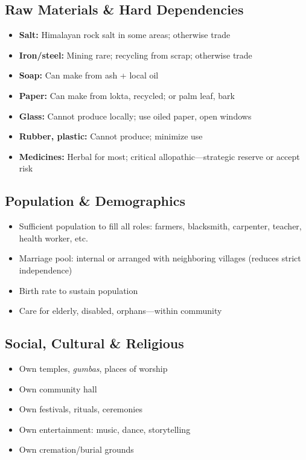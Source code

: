 \documentclass[11pt,a4paper]{article}
\begin{document}
\subsection{Raw Materials \& Hard Dependencies}
\begin{itemize}
    \item \textbf{Salt:} Himalayan rock salt in some areas; otherwise trade
    \item \textbf{Iron/steel:} Mining rare; recycling from scrap; otherwise trade
    \item \textbf{Soap:} Can make from ash + local oil
    \item \textbf{Paper:} Can make from lokta, recycled; or palm leaf, bark
    \item \textbf{Glass:} Cannot produce locally; use oiled paper, open windows
    \item \textbf{Rubber, plastic:} Cannot produce; minimize use
    \item \textbf{Medicines:} Herbal for most; critical allopathic---strategic reserve or accept risk
\end{itemize}

\subsection{Population \& Demographics}
\begin{itemize}
    \item Sufficient population to fill all roles: farmers, blacksmith, carpenter, teacher, health worker, etc.
    \item Marriage pool: internal or arranged with neighboring villages (reduces strict independence)
    \item Birth rate to sustain population
    \item Care for elderly, disabled, orphans---within community
\end{itemize}

\subsection{Social, Cultural \& Religious}
\begin{itemize}
    \item Own temples, \textit{gumbas}, places of worship
    \item Own community hall
    \item Own festivals, rituals, ceremonies
    \item Own entertainment: music, dance, storytelling
    \item Own cremation/burial grounds
\end{itemize}
\end{document}

